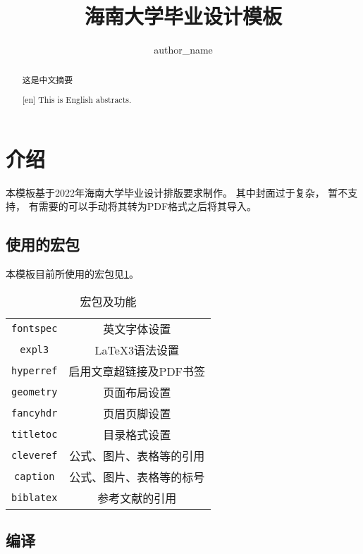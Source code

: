 \documentclass{hainanuthesis}
\title{海南大学毕业设计模板}
\author{author_name}
\begin{document}
\begin{abstract}
    这是中文摘要
\end{abstract}

\begin{abstract}[en]
    This is English abstracts.
\end{abstract}

\newpage
\tableofcontents
\newpage

\section{介绍}

本模板基于2022年海南大学毕业设计排版要求制作。
其中封面过于复杂，
暂不支持，
有需要的可以手动将其转为PDF格式之后将其导入。

\subsection{使用的宏包}

本模板目前所使用的宏包见\cref{tb:01}。

\begin{table}[!htbp]
    \begin{center}
        \caption{宏包及功能}
        \label{tb:01}
        \begin{tabular}{cc}
            \verb|fontspec| & 英文字体设置             \\
            \verb|expl3|    & \LaTeX 3语法设置         \\
            \verb|hyperref| & 启用文章超链接及PDF书签  \\
            \verb|geometry| & 页面布局设置             \\
            \verb|fancyhdr| & 页眉页脚设置             \\
            \verb|titletoc| & 目录格式设置             \\
            \verb|cleveref| & 公式、图片、表格等的引用 \\
            \verb|caption|  & 公式、图片、表格等的标号 \\
            \verb|biblatex| & 参考文献的引用           \\
        \end{tabular}
    \end{center}
\end{table}

\subsection{编译}
\end{document}
